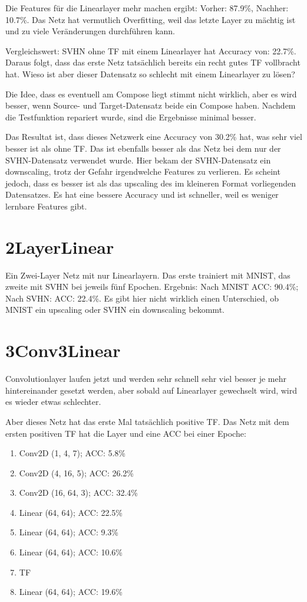     Die Features für die Linearlayer mehr machen ergibt: 
    Vorher: 87.9\%, Nachher: 10.7\%. Das Netz hat vermutlich Overfitting, weil das 
    letzte Layer zu mächtig ist und zu viele Veränderungen durchführen kann. 

    Vergleichswert: SVHN ohne TF mit einem Linearlayer hat Accuracy von: 22.7\%.
    Daraus folgt, dass das erste Netz tatsächlich bereits ein recht gutes TF vollbracht hat. 
    Wieso ist aber dieser Datensatz so schlecht mit einem Linearlayer zu lösen?

    Die Idee, dass es eventuell am Compose liegt stimmt nicht wirklich, aber es wird besser, 
    wenn Source- und Target-Datensatz beide ein Compose haben.
    Nachdem die Testfunktion repariert wurde, sind die Ergebnisse minimal besser. 

    Das Resultat ist, dass dieses Netzwerk eine Accuracy von 30.2\% hat, was sehr viel 
    besser ist als ohne TF.
    Das ist ebenfalls besser als das Netz bei dem nur der SVHN-Datensatz verwendet wurde. 
    Hier bekam der SVHN-Datensatz ein downscaling, trotz der Gefahr irgendwelche Features 
    zu verlieren. Es scheint jedoch, dass es besser ist als das upscaling des im kleineren 
    Format vorliegenden Datensatzes. Es hat eine bessere Accuracy und ist schneller, weil 
    es weniger lernbare Features gibt.

\section{2LayerLinear}
    Ein Zwei-Layer Netz mit nur Linearlayern. Das erste trainiert mit MNIST, das zweite 
    mit SVHN bei jeweils fünf Epochen. Ergebnis: Nach MNIST ACC: 90.4\%; Nach SVHN: ACC: 22.4\%. 
    Es gibt hier nicht wirklich einen Unterschied, ob MNIST ein upscaling oder SVHN ein downscaling 
    bekommt.

\section{3Conv3Linear}
    Convolutionlayer laufen jetzt und werden sehr schnell sehr viel besser je mehr hintereinander 
    gesetzt werden, aber sobald auf Linearlayer gewechselt wird, wird es wieder etwas schlechter.

    Aber dieses Netz hat das erste Mal tatsächlich positive TF. Das Netz mit dem ersten 
    positiven TF hat die Layer und eine ACC bei einer Epoche: 
    \begin{enumerate}
        \item Conv2D (1, 4, 7); ACC: 5.8\%
        \item Conv2D (4, 16, 5); ACC: 26.2\%
        \item Conv2D (16, 64, 3); ACC: 32.4\%
        \item Linear (64, 64); ACC: 22.5\%
        \item Linear (64, 64); ACC: 9.3\%
        \item Linear (64, 64); ACC: 10.6\%
        \item TF
        \item Linear (64, 64); ACC: 19.6\%
    \end{enumerate}

